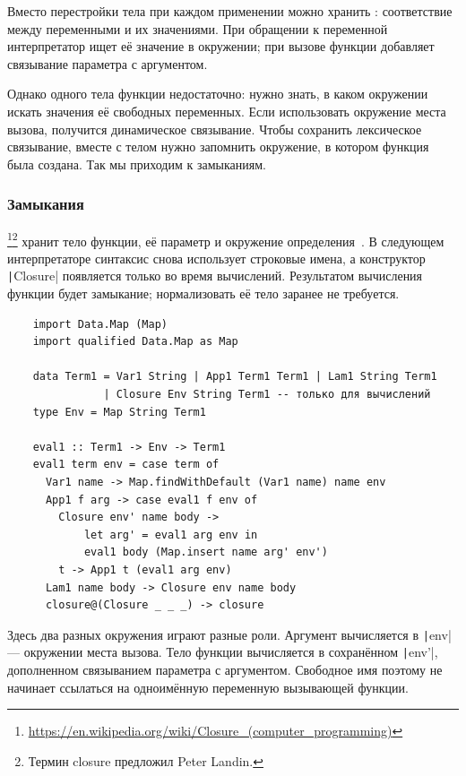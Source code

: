 Вместо перестройки тела при каждом применении можно хранить : соответствие между переменными и их значениями.
При обращении к переменной интерпретатор ищет её значение в окружении; при вызове функции добавляет связывание параметра с аргументом.

Однако одного тела функции недостаточно: нужно знать, в каком окружении искать значения её свободных переменных.
Если использовать окружение места вызова, получится динамическое связывание.
Чтобы сохранить лексическое связывание, вместе с телом нужно запомнить окружение, в котором функция была создана.
Так мы приходим к замыканиям.

\subsubsection{Замыкания} \label{subsubsec:closures}

\footnote{\url{https://en.wikipedia.org/wiki/Closure_(computer_programming)}}\footnote{Термин closure предложил Peter Landin.} хранит тело функции, её параметр и окружение определения~\cite[глава 11]{nystrom2021crafting}.
В следующем интерпретаторе синтаксис снова использует строковые имена, а конструктор \texttt|Closure| появляется только во время вычислений.
Результатом вычисления функции будет замыкание; нормализовать её тело заранее не требуется.

\begin{verbatim}
    import Data.Map (Map)
    import qualified Data.Map as Map

    data Term1 = Var1 String | App1 Term1 Term1 | Lam1 String Term1
               | Closure Env String Term1 -- только для вычислений
    type Env = Map String Term1

    eval1 :: Term1 -> Env -> Term1
    eval1 term env = case term of
      Var1 name -> Map.findWithDefault (Var1 name) name env
      App1 f arg -> case eval1 f env of
        Closure env' name body ->
            let arg' = eval1 arg env in
            eval1 body (Map.insert name arg' env')
        t -> App1 t (eval1 arg env)
      Lam1 name body -> Closure env name body
      closure@(Closure _ _ _) -> closure
\end{verbatim}

Здесь два разных окружения играют разные роли.
Аргумент вычисляется в \texttt|env| --- окружении места вызова.
Тело функции вычисляется в сохранённом \texttt|env'|, дополненном связыванием параметра с аргументом.
Свободное имя поэтому не начинает ссылаться на одноимённую переменную вызывающей функции.

